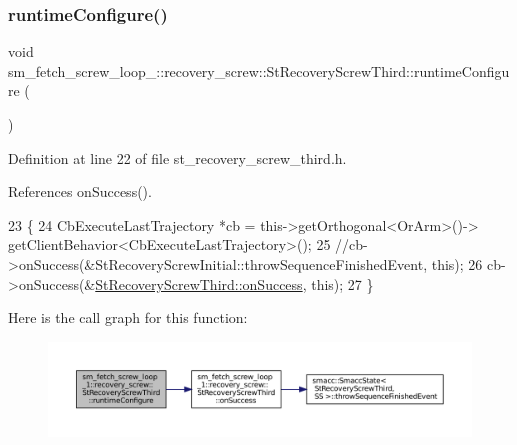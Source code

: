 \subsubsection{\texorpdfstring{runtime\+Configure()}{runtimeConfigure()}}
{\footnotesize\ttfamily void sm\+\_\+fetch\+\_\+screw\+\_\+loop\+\_\+::recovery\+\_\+screw\+::\+St\+Recovery\+Screw\+Third\+::runtime\+Configure (\begin{DoxyParamCaption}{ }\end{DoxyParamCaption})\hspace{0.3cm}{\ttfamily [inline]}}



Definition at line 22 of file st\+\_\+recovery\+\_\+screw\+\_\+third.\+h.



References on\+Success().


\begin{DoxyCode}
23             \{
24                 CbExecuteLastTrajectory *cb = this->getOrthogonal<OrArm>()->
      getClientBehavior<CbExecuteLastTrajectory>();
25                 \textcolor{comment}{//cb->onSuccess(&StRecoveryScrewInitial::throwSequenceFinishedEvent, this);}
26                 cb->onSuccess(&\hyperlink{structsm__fetch__screw__loop__1_1_1recovery__screw_1_1StRecoveryScrewThird_ad2d8eab6f798eff92197acb3242a5860}{StRecoveryScrewThird::onSuccess}, \textcolor{keyword}{this});
27             \}
\end{DoxyCode}
Here is the call graph for this function\+:
\nopagebreak
\begin{figure}[H]
\begin{center}
\leavevmode
\includegraphics[width=350pt]{structsm__fetch__screw__loop__1_1_1recovery__screw_1_1StRecoveryScrewThird_a31a386e480d4abe7cd2014c92ee67dbc_cgraph}
\end{center}
\end{figure}
\mbox{\label{structsm__fetch__screw__loop__1_1_1recovery__screw_1_1StRecoveryScrewThird_a1e93b04cc156c42d225db87fb74580b1}} 
